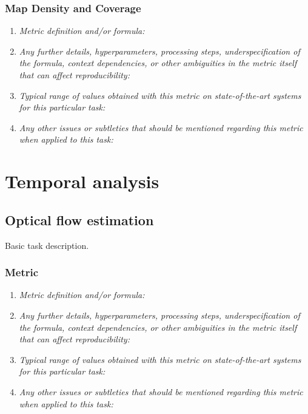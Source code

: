 \documentclass[a4paper,11pt]{article}
\begin{document}
        \subsubsection{Map Density and Coverage}
            \begin{enumerate}[label=\alph*.]
                \item \textit{Metric definition and/or formula:}
                \bigskip
                \item \textit{Any further details, hyperparameters, processing steps, underspecification of the formula, context dependencies, or other ambiguities in the metric itself that can affect reproducibility:}
                \bigskip
                \item \textit{Typical range of values obtained with this metric on state-of-the-art systems for this particular task:}
                \bigskip
                \item \textit{Any other issues or subtleties that should be mentioned regarding this metric when applied to this task:}
                \bigskip
            \end{enumerate}
        

\section{Temporal analysis}
    \subsection{Optical flow estimation} \label{optical_flow_estimation}
        Basic task description.
        \subsubsection{Metric}
            \begin{enumerate}[label=\alph*.]
                \item \textit{Metric definition and/or formula:}
                \bigskip
                \item \textit{Any further details, hyperparameters, processing steps, underspecification of the formula, context dependencies, or other ambiguities in the metric itself that can affect reproducibility:}
                \bigskip
                \item \textit{Typical range of values obtained with this metric on state-of-the-art systems for this particular task:}
                \bigskip
                \item \textit{Any other issues or subtleties that should be mentioned regarding this metric when applied to this task:}
                \bigskip
            \end{enumerate}
\end{document}
